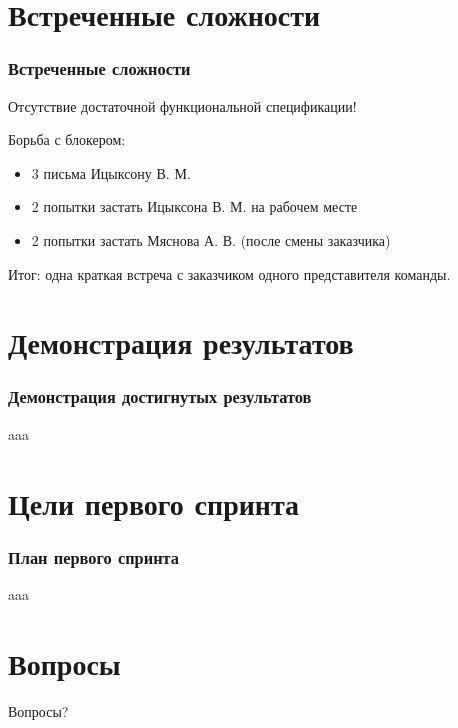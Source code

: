 \documentclass{beamer}
\begin{document}
\section{Встреченные сложности}

\begin{frame}
\frametitle{Встреченные сложности}

Отсутствие достаточной функциональной спецификации!
\bigskip

Борьба с блокером:
\begin{itemize}
\item 3 письма Ицыксону В. М.
\item 2 попытки застать Ицыксона В. М. на рабочем месте
\item 2 попытки застать Мяснова А. В. (после смены заказчика)
\end{itemize}
\bigskip

Итог: одна краткая встреча с заказчиком одного представителя команды.

\end{frame}


\section{Демонстрация результатов}

\begin{frame}
\frametitle{Демонстрация достигнутых результатов}

aaa

\end{frame}

\section{Цели первого спринта}

\begin{frame}
\frametitle{План первого спринта}

aaa

\end{frame}

\section{Вопросы}

\begin{frame}
\Huge{\centerline{Вопросы?}}
\end{frame}

\end{document}
